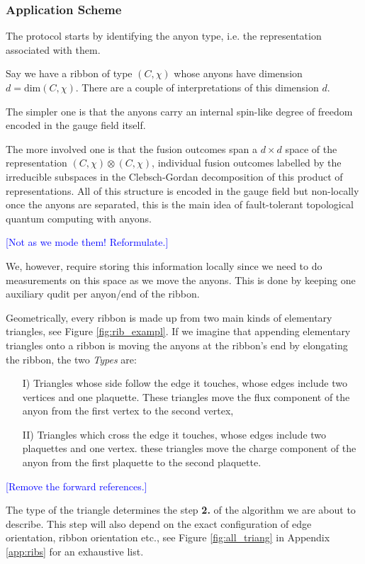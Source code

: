 \documentclass[two column]{article}
\newcommand{\jovan}[1]{\textcolor{blue}{[#1]}}
\begin{document}
\subsubsection{Application Scheme}

The protocol starts by identifying the anyon type, i.e. the representation associated with them. 

Say we have a ribbon of type $(C, \chi)$ whose anyons have dimension $d = \text{dim}(C, \chi)$. There are a couple of interpretations of this dimension $d$.

The simpler one is that the anyons carry an internal spin-like degree of freedom encoded in the gauge field itself. 

The more involved one is that the fusion outcomes span a $d\times d$ space of the representation $(C, \chi) \otimes (C, \chi)$, individual fusion outcomes labelled by the irreducible subspaces in the Clebsch-Gordan decomposition of this product of representations. All of this structure is encoded in the gauge field but non-locally once the anyons are separated, this is the main idea of fault-tolerant topological quantum computing with anyons.

\jovan{Not as we mode them! Reformulate.}

We, however, require storing this information locally since we need to do measurements on this space as we move the anyons. This is done by keeping one auxiliary qudit per anyon/end of the ribbon.

Geometrically, every ribbon is made up from two main kinds of elementary triangles, see Figure \ref{fig:rib_exampl}. If we imagine that appending elementary triangles onto a ribbon is moving the anyons at the ribbon's end by elongating the ribbon, the two \textit{Types} are:\begin{itemize}
    \item[I)] Triangles whose side follow the edge it touches, whose edges include two vertices and one plaquette. These triangles move the flux component of the anyon from the first vertex to the second vertex,
    \item[II)] Triangles which cross the edge it touches, whose edges include two plaquettes and one vertex. these triangles move the charge component of the anyon from the first plaquette to the second plaquette.
\end{itemize}

\jovan{Remove the forward references.}

The type of the triangle determines the step \textbf{2.} of the algorithm we are about to describe. This step will also depend on the exact configuration of edge orientation, ribbon orientation etc., see Figure \ref{fig:all_triang} in Appendix \ref{app:ribs} for an exhaustive list.
\end{document}
